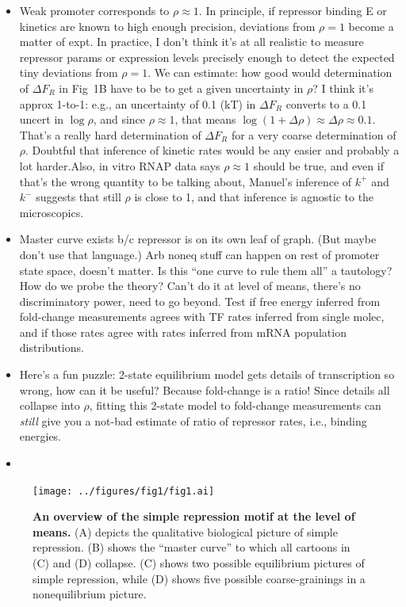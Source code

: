 \documentclass[12pt]{article}%
\begin{document}
{\begin{itemize}
other pictures would respond.
In theory you could refit their raw data to different models, but
as we see later, even having data of full mRNA distributions is
insufficient to identify parameters in all but the simplest of
the models in Figs.\ 1 and 2, so it seems doubtful that only
measurements of means would fare better.
??Double check, what did they actually measure in 2012 paper??
\item Weak promoter corresponds to $\rho\approx 1$. In principle,
if repressor binding E or kinetics are known to high enough
precision, deviations from $\rho=1$ become a matter of expt. In
practice, I don't think it's at all realistic to measure
repressor params or expression levels precisely enough to detect
the expected tiny deviations from $\rho=1$. We can estimate: how
good would determination of $\Delta F_R$ in Fig~1B have to be to
get a given uncertainty in $\rho$? I think it's approx 1-to-1:
e.g., an uncertainty of 0.1 (kT) in $\Delta F_R$ converts to a
0.1 uncert in $\log\rho$, and since $\rho\approx 1$, that means
$\log(1+\Delta\rho)\approx\Delta\rho\approx 0.1$.
That's a really hard determination of $\Delta F_R$ for a very
coarse determination of $\rho$. Doubtful that inference of
kinetic rates would be any easier and probably a lot harder.Also,
in vitro RNAP data says $\rho\approx 1$ should be true, and even
if that's the wrong quantity to be talking about, Manuel's
inference of $k^+$ and $k^-$ suggests that still $\rho$ is close
to 1, and that inference is agnostic to the microscopics.
\item Master curve exists b/c repressor is on its own leaf of
graph. (But maybe don't use that language.) Arb noneq stuff can
happen on rest of promoter state space, doesn't matter. Is this
``one curve to rule them all'' a tautology? How do we probe the
theory? Can't do it at level of means, there's no discriminatory
power, need to go beyond. Test if free energy inferred from
fold-change measurements agrees with TF rates inferred from
single molec, and if those rates agree with rates inferred from
mRNA population distributions.
\item Here's a fun puzzle: 2-state equilibrium model gets details
of transcription so wrong, how can it be useful? Because
fold-change is a ratio! Since details all collapse into $\rho$,
fitting this 2-state model to fold-change measurements can
\textit{still} give you a not-bad estimate of ratio of repressor
rates, i.e., binding energies.
\item 
\end{itemize}
}
\begin{figure}%
\centering
\texttt{[image: ../figures/fig1/fig1.ai]}
\caption{\textbf{
    An overview of the simple repression motif at the level of means.}
    (A) depicts the qualitative biological picture of simple repression.
    (B) shows the ``master curve'' to which all cartoons in (C) and (D) collapse.
    (C) shows two possible equilibrium pictures of simple repression, while
    (D) shows five possible coarse-grainings in a nonequilibrium picture.
    }
\label{fig1:means_cartoons}
\end{figure}
\end{document}
